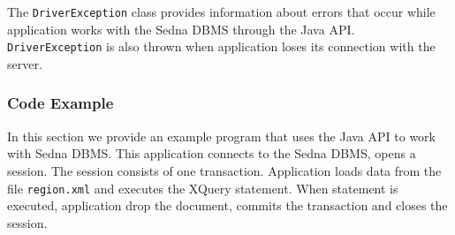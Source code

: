 \documentclass[a4paper,12pt]{article}
\begin{document}
The \verb!DriverException! class provides information about errors that occur
while application works with the Sedna DBMS through the Java API.
\verb!DriverException! is also thrown when application loses its connection with
the server.


\subsubsection{Code Example}

In this section we provide an example program that uses the Java API to work
with Sedna DBMS. This application connects to the Sedna DBMS, opens a session.
The session consists of one transaction. Application loads data from the file
\verb!region.xml! and executes the XQuery statement. When statement is executed,
application drop the document, commits the transaction and closes the session.
\end{document}
